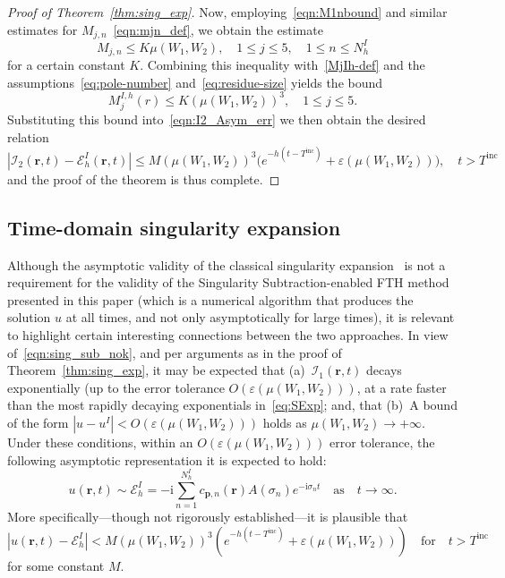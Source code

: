 \documentclass[11pt]{article}
\theoremstyle{plain}
\theoremstyle{remark}
\def \br{\mathbf{r}}
\def \bp{\mathbf{p}}
\begin{document}
\begin{proof}[Proof of Theorem~\ref{thm:sing_exp}]
Now, employing~\eqref{eqn:M1nbound} and similar estimates for
$M_{j,n}$~\eqref{eqn:mjn_def}, we obtain the estimate
\begin{equation*}
M_{j,n} \le K\mu(W_1, W_2), \quad 1 \le j \le 5, \quad 1 \le n \le N^I_h
\end{equation*}
for a certain constant $K$.  Combining this inequality
with~\eqref{MjIh-def} and the assumptions~\eqref{eq:pole-number}
and~\eqref{eq:residue-size} yields the bound
\begin{equation*}
M^{I,h}_j(r) \le K(\mu(W_1, W_2))^3, \quad 1 \le j \le 5.
\end{equation*}
Substituting this bound into~\eqref{eqn:I2_Asym_err} we then obtain the desired relation
\begin{equation*}
|\mathcal{I}_2(\br,t) - \mathcal{E}_h^{I}(\br,t)|
\le M(\mu(W_1, W_2))^3 \big(e^{-h(t - T^\mathrm{inc})} + \varepsilon(\mu(W_1, W_2))\big),
\quad t > T^\mathrm{inc}
\end{equation*}
and the proof of the theorem is thus complete.
\end{proof}

\subsection{Time-domain singularity expansion}\label{sec:SEM}
Although the asymptotic validity of the classical singularity
expansion~\cite{lax1969decaying,lax2005exponential,
  tang2000resonance,baum2005singularity} is not a requirement for the
validity of the Singularity Subtraction-enabled FTH method presented in this paper
(which is a numerical algorithm that produces the solution $u$ at all
times, and not only asymptotically for large times), it is relevant to
highlight certain interesting connections between the two
approaches. In view of~\eqref{eqn:sing_sub_nok}, and per arguments as
in the proof of Theorem~\ref{thm:sing_exp}, it may be expected that
(a)~$\mathcal{I}_1(\br,t)$ decays exponentially (up to the error
tolerance $O(\varepsilon(\mu(W_1,W_2)))$, at a rate faster than the
most rapidly decaying exponentials in~\eqref{eq:SExp}; and, that (b)~A
bound of the form $|u - u^I| < O(\varepsilon(\mu(W_1,W_2)))$ holds as
$\mu(W_1,W_2) \to +\infty$. Under these conditions, within an
$O(\varepsilon(\mu(W_1,W_2)))$ error tolerance, the following
asymptotic representation it is expected to hold:
\begin{equation}\label{eqn:usem}
  u(\br,t) \sim \mathcal{E}_h^I = -\mathrm{i}\sum_{n=1}^{N_h^{I}} c_{\bp,n}(\br) A(\sigma_n)e^{-\mathrm{i}\sigma_nt} \quad \text{as}\quad t \to \infty.
\end{equation}
More specifically---though not rigorously established---it is plausible that
\[
|u(\br,t) - \mathcal{E}_h^I| < M (\mu(W_1,W_2))^3 (e^{-h(t - T^\mathrm{inc})} + \varepsilon(\mu(W_1,W_2))) \quad \text{for} \quad t > T^\mathrm{inc}\quad
\]
for some constant $M$.
\end{document}
